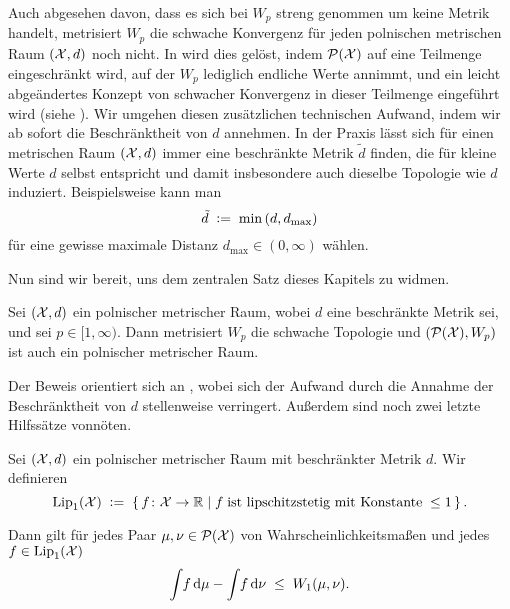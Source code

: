 \documentclass[../thesis/thesis.tex]{subfiles}
\begin{document}
	Auch abgesehen davon, dass es sich bei $W_p$ streng genommen um keine Metrik handelt, metrisiert $W_p$ die schwache Konvergenz für jeden polnischen metrischen Raum $(\mathcal{X}, d)$ noch nicht.
	In \cite{Villani.2009} wird dies gelöst, indem $\mathcal{P}(\mathcal{X})$ auf eine Teilmenge eingeschränkt wird, auf der $W_p$ lediglich endliche Werte annimmt, und ein leicht abgeändertes Konzept
	von schwacher Konvergenz in dieser Teilmenge eingeführt wird (siehe \cite[Definition 6.4 und 6.8]{Villani.2009}). Wir umgehen diesen zusätzlichen technischen Aufwand, 
	indem wir ab sofort die Beschränktheit von $d$ annehmen.
	In der Praxis lässt sich für einen metrischen Raum $(\mathcal{X}, d)$ immer eine beschränkte Metrik $\tilde{d}$ finden, die für kleine Werte $d$ selbst entspricht und damit insbesondere auch dieselbe Topologie wie $d$ induziert. Beispielsweise kann man
	\[ \tilde{d} \; \vcentcolon = \; \min \left(d, d_{\max}\right) \]
	für eine gewisse maximale Distanz $d_{\max} \in (0, \infty)$ wählen.

	Nun sind wir bereit, uns dem zentralen Satz dieses Kapitels zu widmen.

	\begin{Satz}
		\label{satz:wassersteinmetrik_schwache_konvergenz}
		Sei $(\mathcal{X}, d)$ ein polnischer metrischer Raum, wobei $d$ eine beschränkte Metrik sei, und sei $p \in [1, \infty)$. Dann metrisiert $W_p$ die schwache
		Topologie und $(\mathcal{P}(\mathcal{X}), W_p)$ ist auch ein polnischer metrischer Raum.
	\end{Satz}

	Der Beweis orientiert sich an \cite[Theorem 6.9 und Corollary 6.13]{Villani.2009}, wobei sich der Aufwand durch die Annahme der Beschränktheit von $d$ stellenweise verringert.
	Außerdem sind noch zwei letzte Hilfssätze vonnöten.
	
	\begin{Hilfssatz}
		\label{hilfssatz:dualitätsformel_von_kantorovich_rubinstein}
		Sei $(\mathcal{X}, d)$ ein polnischer metrischer Raum mit beschränkter Metrik $d$. Wir definieren
		\[ \mathrm{Lip}_1(\mathcal{X}) \; \vcentcolon = \; \left\{\, f \colon \mathcal{X} \to \mathbb{R} \; \middle| \; f \; \text{ist lipschitzstetig mit Konstante} \; \leq 1  \,\right\} \text{.} \]
		
		Dann gilt für jedes Paar $\mu, \nu \in \mathcal{P}(\mathcal{X})$ von Wahrscheinlichkeitsmaßen und jedes $f \in \mathrm{Lip}_1(\mathcal{X})$
		\[ \int_{} \, f \, \mathrm{d}\mu - \int_{} \, f \, \mathrm{d}\nu \; \leq \; W_1(\mu, \nu) \text{.} \]
	\end{Hilfssatz}
\end{document}
